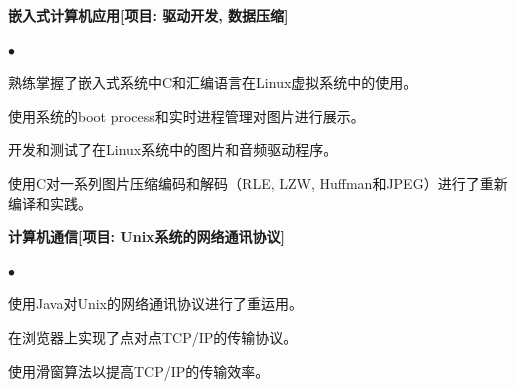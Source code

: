 \documentclass[UTF8]{ctexart}
\newcommand{\courses}[1]{\vspace*{12pt}\normalsize \textbf{#1}\\
}    %
\newenvironment{courseworks}{
\begin{list}
        {$\bullet$}{\topsep 0pt
        \itemsep -2pt}}{\vspace*{4pt}
\end{list}
}
\begin{document}
\courses{嵌入式计算机应用[项目: 驱动开发, 数据压缩]}
\begin{courseworks}
    \item	熟练掌握了嵌入式系统中C和汇编语言在Linux虚拟系统中的使用。
    \item	使用系统的boot process和实时进程管理对图片进行展示。
    \item	开发和测试了在Linux系统中的图片和音频驱动程序。
    \item	使用C对一系列图片压缩编码和解码（RLE, LZW, Huffman和JPEG）进行了重新编译和实践。
\end{courseworks}

\courses{计算机通信[项目: Unix系统的网络通讯协议]}
\begin{courseworks}
    \item	使用Java对Unix的网络通讯协议进行了重运用。
    \item	在浏览器上实现了点对点TCP/IP的传输协议。
    \item	使用滑窗算法以提高TCP/IP的传输效率。
\end{courseworks}


\end{document}
